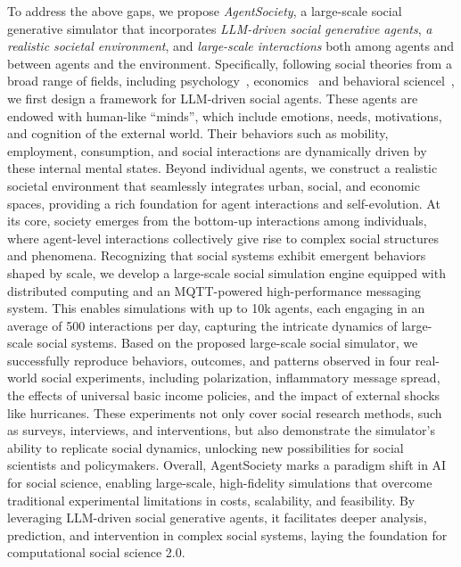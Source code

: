 To address the above gaps, we propose \textit{AgentSociety}, a large-scale social generative simulator that incorporates \textit{LLM-driven social generative agents}, \textit{a realistic societal environment}, and \textit{large-scale interactions} both among agents and between agents and the environment. Specifically, following social theories from a broad range of fields, including psychology~\cite{maslow1943theory,ajzen1991theory}, economics~\cite{christiano2005nominal} and behavioral sciencel~\cite{zipf1946p}, we first design a framework for LLM-driven social agents. These agents are endowed with human-like ``minds'', which include emotions, needs, motivations, and cognition of the external world. Their behaviors such as mobility, employment, consumption, and social interactions are dynamically driven by these internal mental states. Beyond individual agents, we construct a realistic societal environment that seamlessly integrates urban, social, and economic spaces, providing a rich foundation for agent interactions and self-evolution. At its core, society emerges from the bottom-up interactions among individuals, where agent-level interactions collectively give rise to complex social structures and phenomena. Recognizing that social systems exhibit emergent behaviors shaped by scale, we develop a large-scale social simulation engine equipped with distributed computing and an MQTT-powered high-performance messaging system. This enables simulations with up to 10k agents, each engaging in an average of 500 interactions per day, capturing the intricate dynamics of large-scale social systems. Based on the proposed large-scale social simulator, we successfully reproduce behaviors, outcomes, and patterns observed in four real-world social experiments, including polarization, inflammatory message spread, the effects of universal basic income policies, and the impact of external shocks like hurricanes. These experiments not only cover social research methods, such as surveys, interviews, and interventions, but also demonstrate the simulator's ability to replicate social dynamics, unlocking new possibilities for social scientists and policymakers. Overall, AgentSociety marks a paradigm shift in AI for social science, enabling large-scale, high-fidelity simulations that overcome traditional experimental limitations in costs, scalability, and feasibility. By leveraging LLM-driven social generative agents, it facilitates deeper analysis, prediction, and intervention in complex social systems, laying the foundation for computational social science 2.0.

